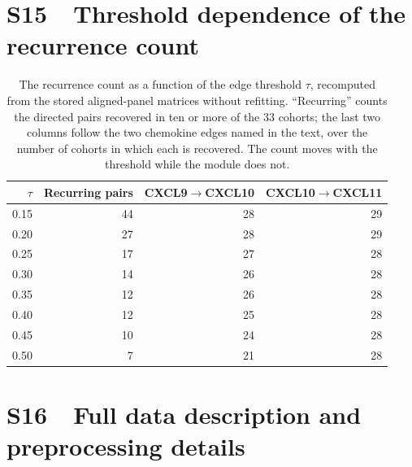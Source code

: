 \documentclass[11pt]{article}
\begin{document}
\section*{S15\ \ Threshold dependence of the recurrence count}

\begin{table}[htbp]
\centering
\caption{The recurrence count as a function of the edge threshold $\tau$, recomputed from the stored aligned-panel matrices without refitting. ``Recurring'' counts the directed pairs recovered in ten or more of the 33 cohorts; the last two columns follow the two chemokine edges named in the text, over the number of cohorts in which each is recovered. The count moves with the threshold while the module does not.}
\label{tab:tau}
\small
\begin{tabular}{rrrr}
\toprule
$\tau$ & Recurring pairs & CXCL9$\rightarrow$CXCL10 & CXCL10$\rightarrow$CXCL11 \\
\midrule
0.15 & 44 & 28 & 29 \\
0.20 & 27 & 28 & 29 \\
0.25 & 17 & 27 & 28 \\
0.30 & 14 & 26 & 28 \\
0.35 & 12 & 26 & 28 \\
0.40 & 12 & 25 & 28 \\
0.45 & 10 & 24 & 28 \\
0.50 & 7 & 21 & 28 \\
\bottomrule
\end{tabular}
\end{table}

\section*{S16\ \ Full data description and preprocessing details}
\end{document}
